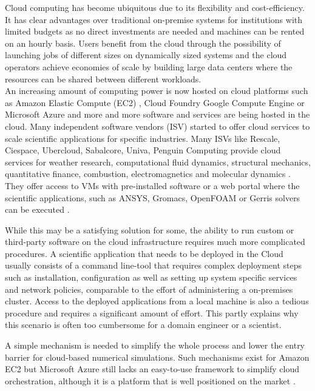 \documentclass[3p,times]{elsarticle}
\begin{document}
Cloud computing has become ubiquitous due to its flexibility and cost-efficiency. It has clear advantages over traditional on-premise systems for institutions with limited budgets as no direct investments are needed and machines can be rented on an hourly basis. Users benefit from the cloud through the possibility of launching jobs of different sizes on dynamically sized systems and the cloud operators achieve economies of scale by building large data centers where the resources can be shared between different workloads. \\
An increasing amount of computing power is now hosted on cloud platforms such as Amazon Elastic Compute (EC2) \cite{ec2}, Cloud Foundry Google Compute Engine \cite{google} or Microsoft Azure \cite{azure} and more and more software and services are being hosted in the cloud. Many independent software vendors (ISV) started to offer cloud services to scale scientific applications for specific industries. Many ISVs like Rescale, Ciespace, Ubercloud, Sabalcore, Univa, Penguin Computing provide cloud services for weather research, computational fluid dynamics, structural mechanics, quantitative finance, combustion, electromagnetics and molecular dynamics \cite{theuebercloud}. They offer access to VMs with pre-installed software or a web portal where the scientific applications, such as ANSYS, Gromacs, OpenFOAM or Gerris solvers can be executed \cite{Popinet2003}.


While this may be a satisfying solution for some, the ability to run custom or third-party software on the cloud infrastructure requires much more complicated procedures. A scientific application that needs to be deployed in the Cloud usually consists of a command line-tool that requires complex deployment steps such as installation, configuration as well as setting up system specific services and network policies, comparable to the effort of administering a on-premises cluster. Access to the deployed applications from a local machine is also a tedious procedure and requires a significant amount of effort. This partly explains why this scenario is often too cumbersome for a domain engineer or a scientist.  

A simple mechanism is needed to simplify the whole process and lower the entry barrier for cloud-based numerical simulations. Such mechanisms exist for Amazon EC2 \cite{ec2} \cite{eucalyptus} but Microsoft Azure still lacks an easy-to-use framework to simplify cloud  orchestration, although it is a platform that is well positioned on the market \cite{Garg2013}.
\end{document}
